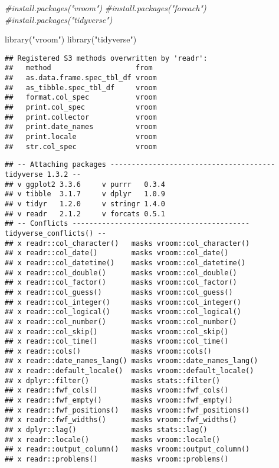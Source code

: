 \documentclass[
]{article}
\newenvironment{Shaded}{\begin{snugshade}}{\end{snugshade}}
\newcommand{\CommentTok}[1]{\textcolor[rgb]{0.56,0.35,0.01}{\textit{#1}}}
\newcommand{\FunctionTok}[1]{\textcolor[rgb]{0.00,0.00,0.00}{#1}}
\newcommand{\NormalTok}[1]{#1}
\newcommand{\StringTok}[1]{\textcolor[rgb]{0.31,0.60,0.02}{#1}}
\begin{document}
\begin{Shaded}
\begin{Highlighting}[]
\CommentTok{\#install.packages("vroom")}
\CommentTok{\#install.packages("foreach")}
\CommentTok{\#install.packages("tidyverse")}

\FunctionTok{library}\NormalTok{(}\StringTok{"vroom"}\NormalTok{)}
\FunctionTok{library}\NormalTok{(}\StringTok{"tidyverse"}\NormalTok{)}
\end{Highlighting}
\end{Shaded}

\begin{verbatim}
## Registered S3 methods overwritten by 'readr':
##   method                    from 
##   as.data.frame.spec_tbl_df vroom
##   as_tibble.spec_tbl_df     vroom
##   format.col_spec           vroom
##   print.col_spec            vroom
##   print.collector           vroom
##   print.date_names          vroom
##   print.locale              vroom
##   str.col_spec              vroom
\end{verbatim}

\begin{verbatim}
## -- Attaching packages --------------------------------------- tidyverse 1.3.2 --
## v ggplot2 3.3.6     v purrr   0.3.4
## v tibble  3.1.7     v dplyr   1.0.9
## v tidyr   1.2.0     v stringr 1.4.0
## v readr   2.1.2     v forcats 0.5.1
## -- Conflicts ------------------------------------------ tidyverse_conflicts() --
## x readr::col_character()   masks vroom::col_character()
## x readr::col_date()        masks vroom::col_date()
## x readr::col_datetime()    masks vroom::col_datetime()
## x readr::col_double()      masks vroom::col_double()
## x readr::col_factor()      masks vroom::col_factor()
## x readr::col_guess()       masks vroom::col_guess()
## x readr::col_integer()     masks vroom::col_integer()
## x readr::col_logical()     masks vroom::col_logical()
## x readr::col_number()      masks vroom::col_number()
## x readr::col_skip()        masks vroom::col_skip()
## x readr::col_time()        masks vroom::col_time()
## x readr::cols()            masks vroom::cols()
## x readr::date_names_lang() masks vroom::date_names_lang()
## x readr::default_locale()  masks vroom::default_locale()
## x dplyr::filter()          masks stats::filter()
## x readr::fwf_cols()        masks vroom::fwf_cols()
## x readr::fwf_empty()       masks vroom::fwf_empty()
## x readr::fwf_positions()   masks vroom::fwf_positions()
## x readr::fwf_widths()      masks vroom::fwf_widths()
## x dplyr::lag()             masks stats::lag()
## x readr::locale()          masks vroom::locale()
## x readr::output_column()   masks vroom::output_column()
## x readr::problems()        masks vroom::problems()
\end{verbatim}
\end{document}
